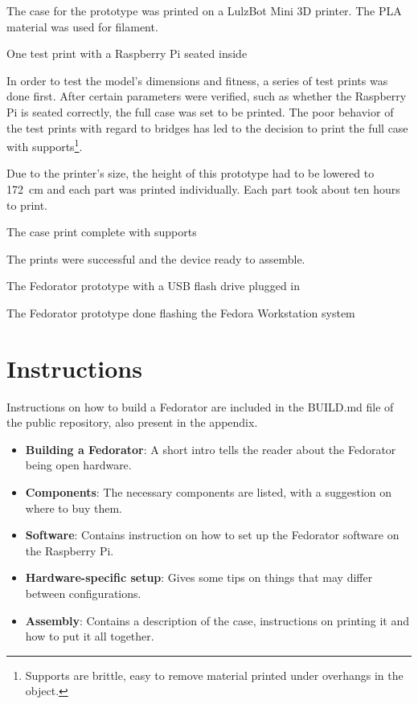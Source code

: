         The case for the prototype was printed on a LulzBot Mini \cite{lulzbot-mini} 3D printer.  The PLA material was used for filament.
        
            {One test print with a Raspberry Pi seated inside}
        
        In order to test the model's dimensions and fitness, a series of test prints was done first.  After certain parameters were verified, such as whether the Raspberry Pi is seated correctly, the full case was set to be printed.  The poor behavior of the test prints with regard to bridges has led to the decision to print the full case with supports\footnote{Supports are brittle, easy to remove material printed under overhangs in the object.}.
        
        Due to the printer's size, the height of this prototype had to be lowered to 172~cm and each part was printed individually.  Each part took about ten hours to print. 
        
            {The case print complete with supports}
        
        The prints were successful and the device ready to assemble.
        
        \newpage
        
        
            {The Fedorator prototype with a USB flash drive plugged in}
            
            {The Fedorator prototype done flashing the Fedora Workstation system}
        
        \newpage
        
        
    \section{Instructions}
        Instructions on how to build a Fedorator are included in the BUILD.md file of the public repository, also present in the appendix.
        
        \begin{itemize}
            \item \textbf{Building a Fedorator}: A short intro tells the reader about the Fedorator being open hardware.
            \item \textbf{Components}: The necessary components are listed, with a suggestion on where to buy them.
            \item \textbf{Software}: Contains instruction on how to set up the Fedorator software on the Raspberry Pi.
            \item \textbf{Hardware-specific setup}: Gives some tips on things that may differ between configurations.
            \item \textbf{Assembly}: Contains a description of the case, instructions on printing it and how to put it all together.
        \end{itemize}
        
